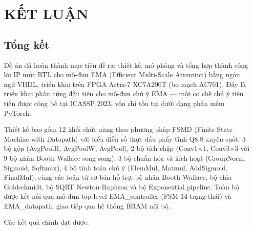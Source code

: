 \documentclass{uetgraduation}
\begin{document}
\chapter{KẾT LUẬN}
\section{Tổng kết}

Đồ án đã hoàn thành mục tiêu đề ra: thiết kế, mô phỏng và tổng hợp thành công
lõi IP mức RTL cho mô-đun EMA (Efficient Multi-Scale Attention) bằng ngôn ngữ VHDL,
triển khai trên FPGA Artix-7 XC7A200T (bo mạch AC701). Đây là triển khai phần cứng
đầu tiên cho mô-đun chú ý EMA --- một cơ chế chú ý tiên tiến được công bố tại
ICASSP 2023, vốn chỉ tồn tại dưới dạng phần mềm PyTorch.

Thiết kế bao gồm 12 khối chức năng theo phương pháp FSMD (Finite State Machine with
Datapath) với biểu diễn số thực dấu phẩy tĩnh Q8.8 xuyên suốt: 3 bộ gộp
(AvgPoolH, AvgPoolW, AvgPool), 2 bộ tích chập (Conv1$\times$1, Conv3$\times$3 với
9 bộ nhân Booth-Wallace song song), 3 bộ chuẩn hóa và kích hoạt (GroupNorm, Sigmoid,
Softmax), 4 bộ tính toán chú ý (ElemMul, Matmul, AddSigmoid, FinalMul), cùng các
toán tử cơ bản hỗ trợ: bộ nhân Booth-Wallace, bộ chia Goldschmidt, bộ SQRT
Newton-Raphson và bộ Exponential pipeline. Toàn bộ được kết nối qua
mô-đun top-level EMA\_controller (FSM 14 trạng thái) và EMA\_datapath, giao tiếp qua
hệ thống BRAM nội bộ.

Các kết quả chính đạt được:
\end{document}
